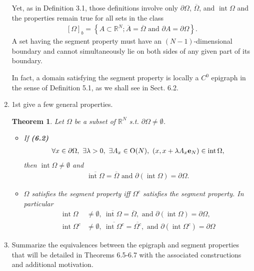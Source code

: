 \documentclass{book}
\numberwithin{equation}{section}
\newtheorem{theorem}{Theorem}[section]
\begin{document}
\begin{enumerate}
    Yet, as in Definition 3.1, those definitions involve only $\partial\Omega$, $\overline{\Omega}$, and $\operatorname{int}\Omega$ and the properties remain true for all sets in the class
    \begin{align*}
        \left[\Omega\right]_b = \left\{A\subset\mathbb{R}^N;\overline{A} = \overline{\Omega} \mbox{ and } \partial A = \partial\Omega\right\}.
    \end{align*}
    A set having the segment property must have an $(N - 1)$-dimensional boundary and cannot simultaneously lie on both sides of any given part of its boundary.
    
    In fact, a domain satisfying the segment property is locally a $C^0$ epigraph in the sense of Definition 5.1, as we shall see in Sect. 6.2.
    \item 1st give a few general properties.
    
    \begin{theorem}
        Let $\Omega$ be a subset of $\mathbb{R}^N$ s.t. $\partial\Omega\ne\emptyset$.
        \begin{itemize}
            \item[(i)] If \textbf{(6.2)}
            \begin{align*}
                \forall x\in\partial\Omega,\ \exists\lambda > 0,\ \exists A_x\in\operatorname{O}(N),\ \left(x,x + \lambda A_x{\bf e}_N\right)\in\operatorname{int}\Omega,
            \end{align*}
            then $\operatorname{int}\Omega\ne\emptyset$ and
            \begin{align*}
                \overline{\operatorname{int}\Omega} = \overline{\Omega} \mbox{ and } \partial\left(\operatorname{int}\Omega\right) = \partial\Omega.
            \end{align*}
            \item[(ii)] $\Omega$ satisfies the segment property iff $\Omega^c$ satisfies the segment property. In particular
            \begin{align*}
                \operatorname{int}\Omega&\ne\emptyset,\ \overline{\operatorname{int}\Omega} = \overline{\Omega}, \mbox{ and } \partial\left(\operatorname{int}\Omega\right) = \partial\Omega,\\
                \operatorname{int}\Omega^c&\ne\emptyset,\ \overline{\operatorname{int}\Omega^c} = \overline{\Omega^c}, \mbox{ and } \partial\left(\operatorname{int}\Omega^c\right) = \partial\Omega
            \end{align*}
        \end{itemize}
    \end{theorem}
    \item Summarize the equivalences between the epigraph and segment properties that will be detailed in Theorems 6.5-6.7 with the associated constructions and additional motivation.
    

\end{enumerate}
\end{document}
